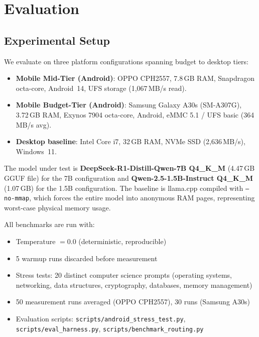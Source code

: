 \documentclass[11pt]{article}
\begin{document}
\section{Evaluation}
\label{sec:eval}

\subsection{Experimental Setup}

We evaluate on three platform configurations spanning budget to desktop tiers:
\begin{itemize}
  \item \textbf{Mobile Mid-Tier (Android)}: OPPO CPH2557,
    7.8\,GB RAM, Snapdragon octa-core,
    Android~14, UFS storage (1,067\,MB/s read).
  \item \textbf{Mobile Budget-Tier (Android)}: Samsung Galaxy A30s (SM-A307G),
    3.72\,GB RAM, Exynos 7904 octa-core,
    Android, eMMC 5.1 / UFS basic (364\,MB/s avg).
  \item \textbf{Desktop baseline}: Intel Core i7,
    32\,GB RAM, NVMe SSD (2,636\,MB/s),
    Windows~11.
\end{itemize}

The model under test is \textbf{DeepSeek-R1-Distill-Qwen-7B Q4\_K\_M}
(4.47\,GB GGUF file) for the 7B configuration and
\textbf{Qwen-2.5-1.5B-Instruct Q4\_K\_M} (1.07\,GB) for the
1.5B configuration.
The baseline is llama.cpp compiled with \texttt{--no-mmap},
which forces the entire model into anonymous RAM pages,
representing worst-case physical memory usage.

All benchmarks are run with:
\begin{itemize}
  \item Temperature $= 0.0$ (deterministic, reproducible)
  \item 5 warmup runs discarded before measurement
  \item Stress tests: 20 distinct computer science prompts (operating systems, networking,
    data structures, cryptography, databases, memory management)
  \item 50 measurement runs averaged (OPPO CPH2557), 30 runs (Samsung A30s)
  \item Evaluation scripts: \texttt{scripts/android\_stress\_test.py},
    \texttt{scripts/eval\_harness.py}, \texttt{scripts/benchmark\_routing.py}
\end{itemize}
\end{document}
